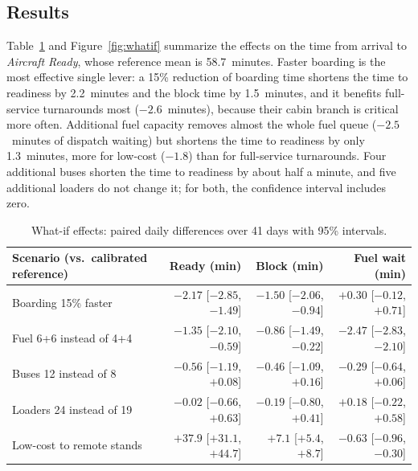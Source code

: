 \subsection{Results}
Table~\ref{tab:whatif} and Figure~\ref{fig:whatif} summarize the effects on the time from arrival to \emph{Aircraft Ready}, whose reference mean is 58.7~minutes. Faster boarding is the most effective single lever: a 15\% reduction of boarding time shortens the time to readiness by 2.2~minutes and the block time by 1.5~minutes, and it benefits full-service turnarounds most ($-2.6$~minutes), because their cabin branch is critical more often. Additional fuel capacity removes almost the whole fuel queue ($-2.5$~minutes of dispatch waiting) but shortens the time to readiness by only 1.3~minutes, more for low-cost ($-1.8$) than for full-service turnarounds. Four additional buses shorten the time to readiness by about half a minute, and five additional loaders do not change it; for both, the confidence interval includes zero.

\begin{table}[htbp]\centering\footnotesize\setlength{\tabcolsep}{4pt}
\begin{tabular}{lrrr}\hline
Scenario (vs.\ calibrated reference) & Ready (min) & Block (min) & Fuel wait (min)\\\hline
Boarding 15\% faster & $-2.17$ [$-2.85$, $-1.49$] & $-1.50$ [$-2.06$, $-0.94$] & $+0.30$ [$-0.12$, $+0.71$]\\
Fuel 6+6 instead of 4+4 & $-1.35$ [$-2.10$, $-0.59$] & $-0.86$ [$-1.49$, $-0.22$] & $-2.47$ [$-2.83$, $-2.10$]\\
Buses 12 instead of 8 & $-0.56$ [$-1.19$, $+0.08$] & $-0.46$ [$-1.09$, $+0.16$] & $-0.29$ [$-0.64$, $+0.06$]\\
Loaders 24 instead of 19 & $-0.02$ [$-0.66$, $+0.63$] & $-0.19$ [$-0.80$, $+0.41$] & $+0.18$ [$-0.22$, $+0.58$]\\
Low-cost to remote stands & $+37.9$ [$+31.1$, $+44.7$] & $+7.1$ [$+5.4$, $+8.7$] & $-0.63$ [$-0.96$, $-0.30$]\\\hline
\end{tabular}
\caption{What-if effects: paired daily differences over 41 days with 95\% intervals.}
\label{tab:whatif}
\end{table}

